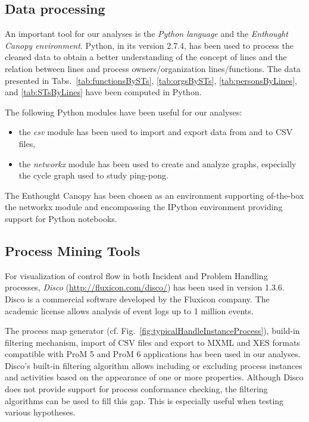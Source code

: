 \documentclass[lnbip]{svmultln}
\begin{document}
\subsection{Data processing}
An important tool for our analyses is the \emph{Python language} and the \emph{Enthought Canopy environment}. Python, in its version 2.7.4, has been used to process the cleaned data to obtain a better understanding of the concept of lines and the relation between lines and process owners/organization lines/functions. The data presented in Tabs.~\ref{tab:functionsBySTs}, \ref{tab:orgsBySTs}, \ref{tab:personsByLines}, and \ref{tab:STsByLines} have been computed in Python.

The following Python modules have been useful for our analyses:
\begin{itemize}
	\item the \emph{csv} module has been used to import and export data from and to CSV files,
	\item the \emph{networkx} module has been used to create and analyze graphs, especially the cycle graph used to study ping-pong.
\end{itemize}

The Enthought Canopy has been chosen as an environment supporting of-the-box the networkx module and encompassing the IPython environment providing support for Python notebooks.

\subsection{Process Mining Tools}
For visualization of control flow in both Incident and Problem Handling processes, \emph{Disco} (\url{http://fluxicon.com/disco/}) has been used in version 1.3.6. Disco is a commercial software developed by the Fluxicon company. The academic license allows analysis of event logs up to 1 million events.

The process map generator (cf. Fig.~\ref{fig:typicalHandleInstanceProcess}), build-in filtering mechanism, import of CSV files and export to MXML and XES formats compatible with ProM 5 and ProM 6 applications has been used in our analyses. Disco's built-in filtering algorithm allows including or excluding process instances and activities based on the appearance of one or more properties. Although Disco does not provide support for process conformance checking, the filtering algorithms can be used to fill this gap. This is especially useful when testing various hypotheses.
\end{document}
